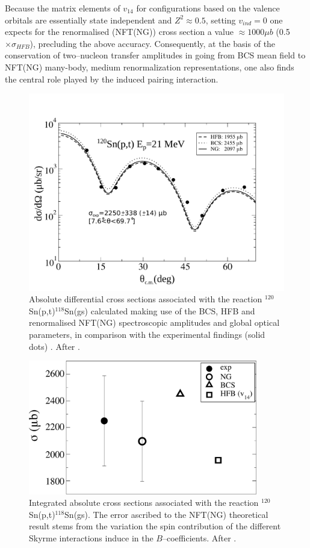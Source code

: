 Because the matrix elements of $v_{14}$ for configurations based  on the valence orbitals are essentially state independent and
$Z^2 \approx 0.5$, setting $v_{ind} = 0$ one expects for the renormalised (NFT(NG)) cross section a value 
$\approx 1000 \mu b$ (0.5 $\times \sigma_{HFB}$), precluding the above accuracy. Consequently, at the basis 
of the  conservation of two--nucleon transfer  amplitudes in going 
from BCS mean field to NFT(NG) many-body, medium renormalization representations, one also finds the central role  played by the induced pairing
interaction.
  \begin{figure}
  \centerline{\includegraphics*[width=12cm,angle=0]{C8/figsC8/Fig2}}
  	\caption{Absolute differential  cross sections associated with the reaction
  	$^{120}$Sn(p,t)$^{118}$Sn(gs) calculated making use of the BCS, HFB and renormalised NFT(NG) spectroscopic 
  	amplitudes and global optical parameters, in comparison with the experimental findings (solid dots) \cite{Guazzoni:08}. After \cite{Potel:17}.}\label{fig6.4.2}
  \end{figure}
  \begin{figure}
  \centerline{\includegraphics*[width=10cm,angle=0]{C8/figsC8/fig5}}
  	\caption{Integrated absolute  cross sections associated with the reaction
  	$^{120}$Sn(p,t)$^{118}$Sn(gs). The error ascribed  to
  	the NFT(NG) theoretical result stems from the variation the spin contribution of the different Skyrme interactions induce in the $B$--coefficients. After \cite{Potel:17}.}\label{fig6.4.3}
  \end{figure}
  

